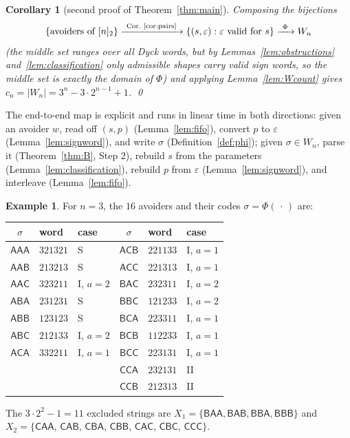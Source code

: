 \documentclass[11pt]{article}
\newtheorem{corollary}[theorem]{Corollary}
\theoremstyle{definition}
\newtheorem{example}[theorem]{Example}
\theoremstyle{remark}
\newcommand{\nn}{[n]_2}
\newcommand{\sA}{\mathsf{A}}
\newcommand{\sB}{\mathsf{B}}
\newcommand{\sC}{\mathsf{C}}
\newcommand{\Wn}{W_n}
\begin{document}
\begin{corollary}[second proof of Theorem~\ref{thm:main}]\label{cor:secondproof}
Composing the bijections
\[
 \{\text{avoiders of }\nn\}
 \xrightarrow{\ \text{Cor.~\ref{cor:pairs}}\ }
 \{(s,\varepsilon):\varepsilon\text{ valid for }s\}
 \xrightarrow{\ \Phi\ } \Wn
\]
(the middle set ranges over all Dyck words, but by
Lemmas~\ref{lem:obstructions} and~\ref{lem:classification} only admissible
shapes carry valid sign words, so the middle set is exactly the domain of
$\Phi$) and applying Lemma~\ref{lem:Wcount} gives
$c_n=|\Wn|=3^n-3\cdot2^{n-1}+1$. \qed
\end{corollary}

The end-to-end map is explicit and runs in linear time in both directions:
given an avoider $w$, read off $(s,p)$ (Lemma~\ref{lem:fifo}), convert $p$
to $\varepsilon$ (Lemma~\ref{lem:signword}), and write $\sigma$
(Definition~\ref{def:phi}); given $\sigma\in\Wn$, parse it
(Theorem~\ref{thm:B}, Step 2), rebuild $s$ from the parameters
(Lemma~\ref{lem:classification}), rebuild $p$ from $\varepsilon$
(Lemma~\ref{lem:signword}), and interleave (Lemma~\ref{lem:fifo}).

\begin{example}\label{ex:table}
For $n=3$, the $16$ avoiders and their codes
$\sigma=\Phi(\,\cdot\,)$ are:
\begin{center}
\begin{tabular}{cll@{\qquad}cll}
\toprule
$\sigma$ & word & case & $\sigma$ & word & case\\
\midrule
$\sA\sA\sA$ & $321321$ & S & $\sA\sC\sB$ & $221133$ & I, $a=1$\\
$\sA\sA\sB$ & $213213$ & S & $\sA\sC\sC$ & $221313$ & I, $a=1$\\
$\sA\sA\sC$ & $323211$ & I, $a=2$ & $\sB\sA\sC$ & $232311$ & I, $a=2$\\
$\sA\sB\sA$ & $231231$ & S & $\sB\sB\sC$ & $121233$ & I, $a=2$\\
$\sA\sB\sB$ & $123123$ & S & $\sB\sC\sA$ & $223311$ & I, $a=1$\\
$\sA\sB\sC$ & $212133$ & I, $a=2$ & $\sB\sC\sB$ & $112233$ & I, $a=1$\\
$\sA\sC\sA$ & $332211$ & I, $a=1$ & $\sB\sC\sC$ & $223131$ & I, $a=1$\\
 & & & $\sC\sC\sA$ & $232131$ & II\\
 & & & $\sC\sC\sB$ & $212313$ & II\\
\bottomrule
\end{tabular}
\end{center}
The $3\cdot2^{2}-1=11$ excluded strings are
$X_1=\{\sB\sA\sA,\sB\sA\sB,\sB\sB\sA,\sB\sB\sB\}$ and
$X_2=\{\sC\sA\sA$, $\sC\sA\sB$, $\sC\sB\sA$, $\sC\sB\sB$, $\sC\sA\sC$,
$\sC\sB\sC$, $\sC\sC\sC\}$.
\end{example}
\end{document}
